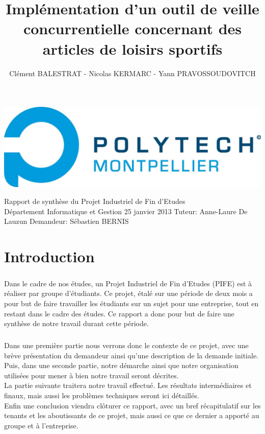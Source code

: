 \documentclass{report}
\title{\LARGE Implémentation d'un outil de veille concurrentielle concernant des articles de loisirs sportifs}      %
\author{Clément BALESTRAT - Nicolas KERMARC - Yann PRAVOSSOUDOVITCH}
\makeatletter
\def\thetitle{\@title}
\def\theauthor{\large\@author}
\makeatother
\begin{document}
\begin{titlepage}

\includegraphics[scale=0.1]{logo.jpg} 

\centering
\vfill
{\Huge\bfseries \thetitle}
\vskip 1cm
{\Large \theauthor}
\hspace{10.5cm}
\vskip 0.25cm
\Large Rapport de synthèse du Projet Industriel de Fin d'Etudes\\
\Large Département Informatique et Gestion
\vskip 0.25cm
\Large 25 janvier 2013
\vskip 0.5cm
\vfill
\large Tuteur: Anne-Laure De Lauzun
\hspace{2cm}
\large Demandeur: Sébastien BERNIS
\end{titlepage}



\renewcommand{\contentsname}{Sommaire}
 


\tableofcontents

\chapter{Introduction}

\paragraph{}

Dans le cadre de nos études, un Projet Industriel de Fin d'Etudes (PIFE) est à réaliser par groupe d'étudiants. Ce projet, étalé sur une période de deux mois a pour but de faire travailler les étudiants sur un sujet pour une entreprise, tout en restant dans le cadre des études. Ce rapport a donc pour but de faire une synthèse de notre travail durant cette période.

\paragraph{}

Dans une première partie nous verrons donc le contexte de ce projet, avec une brève présentation du demandeur ainsi qu'une description de la demande initiale. \\Puis, dans une seconde partie, notre démarche ainsi que notre organisation utilisées pour mener à bien notre travail seront décrites. \\La partie suivante traitera notre travail effectué. Les résultats intermédiaires et finaux, mais aussi les problèmes techniques seront ici détaillés. \\Enfin une conclusion viendra clôturer ce rapport, avec un bref récapitulatif sur les tenants et les aboutissants de ce projet, mais aussi ce que ce dernier a apporté au groupe et à l'entreprise.
\end{document}
